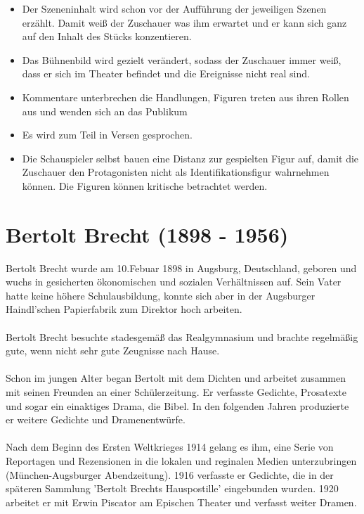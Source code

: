 \documentclass[a4paper]{article}
\begin{document}
        \begin{itemize}
	\item Der Szeneninhalt wird schon vor der Aufführung der jeweiligen Szenen erzählt. Damit weiß der Zuschauer was ihm erwartet und er kann sich ganz auf den Inhalt des Stücks konzentieren.
        \item Das Bühnenbild wird gezielt verändert, sodass der Zuschauer immer weiß, dass er sich im Theater befindet und die Ereignisse nicht real sind.
        \item Kommentare unterbrechen die Handlungen, Figuren treten aus ihren Rollen aus und wenden sich an das Publikum
        \item Es wird zum Teil in Versen gesprochen.
        \item Die Schauspieler selbst bauen eine Distanz zur gespielten Figur auf, damit die Zuschauer den Protagonisten nicht als Identifikationsfigur wahrnehmen können. Die Figuren können kritische betrachtet werden.
        \end{itemize}
        
        \newpage
        \section{Bertolt Brecht (1898 - 1956)}

	Bertolt Brecht wurde am 10.Febuar 1898 in Augsburg, Deutschland, geboren und wuchs in gesicherten ökonomischen und sozialen Verhältnissen auf. Sein Vater hatte keine höhere Schulausbildung, konnte sich aber in der Augsburger Haindl'schen Papierfabrik zum Direktor hoch arbeiten.\\\\
        Bertolt Brecht besuchte stadesgemäß das Realgymnasium und brachte regelmäßig gute, wenn nicht sehr gute Zeugnisse nach Hause.\\\\
        Schon im jungen Alter began Bertolt mit dem Dichten und arbeitet zusammen mit seinen Freunden an einer Schülerzeitung. Er verfasste Gedichte, Prosatexte und sogar ein einaktiges Drama, die Bibel. In den folgenden Jahren produzierte er weitere Gedichte und Dramenentwürfe.\\\\
        Nach dem Beginn des Ersten Weltkrieges 1914 gelang es ihm, eine Serie von Reportagen und Rezensionen in die lokalen und reginalen Medien unterzubringen (München-Augsburger Abendzeitung). 1916 verfasste er Gedichte, die in der späteren Sammlung 'Bertolt Brechts Hauspostille' eingebunden wurden. 1920 arbeitet er mit Erwin Piscator am Epischen Theater und verfasst weiter Dramen.\\\\
\end{document}
